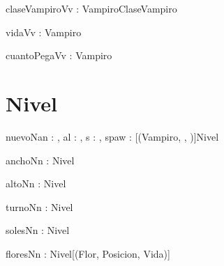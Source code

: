 \documentclass[spanish,a4paper]{article}
\begin{document}
\begin{problema}{claseVampiroV}{v : Vampiro}{ClaseVampiro}
\end{problema}

\begin{problema}{vidaV}{v : Vampiro}{\ent}
\end{problema}

\begin{problema}{cuantoPegaV}{v : Vampiro}{\ent}
\end{problema}


\section{Nivel}


\begin{problema}{nuevoN}{an : \ent, al : \ent, s : \ent, spaw : [(Vampiro, \ent, \ent)]}{Nivel}
\end{problema}

\begin{problema}{anchoN}{n : Nivel}{\ent}
\end{problema}

\begin{problema}{altoN}{n : Nivel}{\ent}
\end{problema}


\begin{problema}{turnoN}{n : Nivel}{\ent}
\end{problema}

\begin{problema}{solesN}{n : Nivel}{\ent}
\end{problema}

\begin{problema}{floresN}{n : Nivel}{[(Flor, Posicion, Vida)]}
\end{problema}
\end{document}

